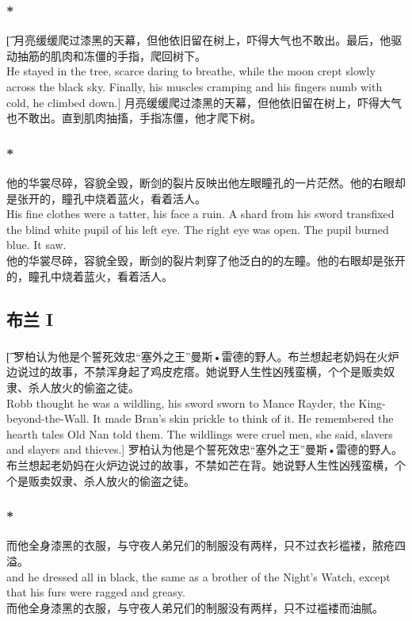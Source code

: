 \documentclass[12pt,a4paper]{article}
\begin{document}
\subsubsection{\color{red}*}\t[
	月亮缓缓爬过漆黑的天幕，但他依旧留在树上，吓得大气也不敢出。最后，他驱动抽筋的肌肉和冻僵的手指，爬回树下。\\
	He stayed in the tree, scarce daring to breathe, while the moon crept slowly across the black sky. Finally, his muscles cramping and his fingers numb with cold, he climbed down.]
	月亮缓缓爬过漆黑的天幕，但他依旧留在树上，吓得大气也不敢出。直到肌肉抽搐，手指冻僵，他才爬下树。
	
\subsubsection{\color{red}*}{\color{blue}
他的华裳尽碎，容貌全毁，断剑的裂片反映出他左眼瞳孔的一片茫然。他的右眼却是张开的，瞳孔中烧着蓝火，看着活人。\\
His fine clothes were a tatter, his face a ruin. A shard from his sword transfixed the blind white pupil of his left eye. The right eye was open. The pupil burned blue. It saw.}\\
他的华裳尽碎，容貌全毁，断剑的裂片刺穿了他泛白的的左瞳。他的右眼却是张开的，瞳孔中烧着蓝火，看着活人。

\subsection{布兰 I}	

\subsubsection{}\t[	
	罗柏认为他是个誓死效忠“塞外之王”曼斯•雷德的野人。布兰想起老奶妈在火炉边说过的故事，不禁浑身起了鸡皮疙瘩。她说野人生性凶残蛮横，个个是贩卖奴隶、杀人放火的偷盗之徒。\\
	Robb thought he was a wildling, his sword sworn to Mance Rayder, the King-beyond-the-Wall. It made Bran's skin prickle to think of it. He remembered the hearth tales Old Nan told them. The wildlings were cruel men, she said, slavers and slayers and thieves.]
	罗柏认为他是个誓死效忠“塞外之王”曼斯•雷德的野人。布兰想起老奶妈在火炉边说过的故事，不禁如芒在背。她说野人生性凶残蛮横，个个是贩卖奴隶、杀人放火的偷盗之徒。
	
\subsubsection{\color{red}*}{\color{blue}
而他全身漆黑的衣服，与守夜人弟兄们的制服没有两样，只不过衣衫褴褛，脓疮四溢。\\
and he dressed all in black, the same as a brother of the Night's Watch, except that his furs were ragged and greasy.}\\
而他全身漆黑的衣服，与守夜人弟兄们的制服没有两样，只不过褴褛而油腻。
	
\end{document}
